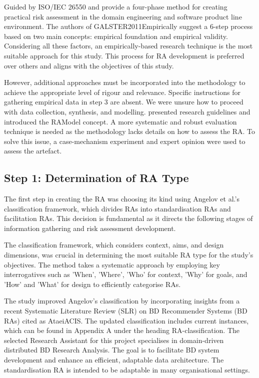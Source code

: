 \documentclass[journal]{IEEEtran}
\begin{document}
Guided by ISO/IEC 26550 \cite{wg2015iso} and \cite{Derras} provide a four-phase method for creating practical risk assessment in the domain engineering and software product line environment. The authors of GALSTER2011Empirically suggest a 6-step process based on two main concepts: empirical foundation and empirical validity. Considering all these factors, an empirically-based research technique is the most suitable approach for this study. This process for RA development is preferred over others and aligns with the objectives of this study.

However, additional approaches must be incorporated into the methodology to achieve the appropriate level of rigour and relevance. Specific instructions for gathering empirical data in step 3 are absent. We were unsure how to proceed with data collection, synthesis, and modelling. \cite{Nakagawa} presented research guidelines and introduced the RAModel concept. A more systematic and robust evaluation technique is needed as the methodology lacks details on how to assess the RA. To solve this issue, a case-mechanism experiment and expert opinion were used to assess the artefact.


\subsection{Step 1: Determination of RA Type}

The first step in creating the RA was choosing its kind using Angelov et al.'s classification framework, which divides RAs into standardisation RAs and facilitation RAs. This decision is fundamental as it directs the following stages of information gathering and risk assessment development. 

The classification framework, which considers context, aims, and design dimensions, was crucial in determining the most suitable RA type for the study's objectives. The method takes a systematic approach by employing key interrogatives such as 'When', 'Where', 'Who' for context, 'Why' for goals, and 'How' and 'What' for design to efficiently categorise RAs.

The study improved Angelov's classification by incorporating insights from a recent Systematic Literature Review (SLR) on BD Recommender Systems (BD RAs) cited as AtaeiACIS. The updated classification includes current instances, which can be found in Appendix A under the heading RA-classification. The selected Research Assistant for this project specialises in domain-driven distributed BD Research Analysis. The goal is to facilitate BD system development and enhance an efficient, adaptable data architecture. The standardisation RA is intended to be adaptable in many organisational settings.
\end{document}
